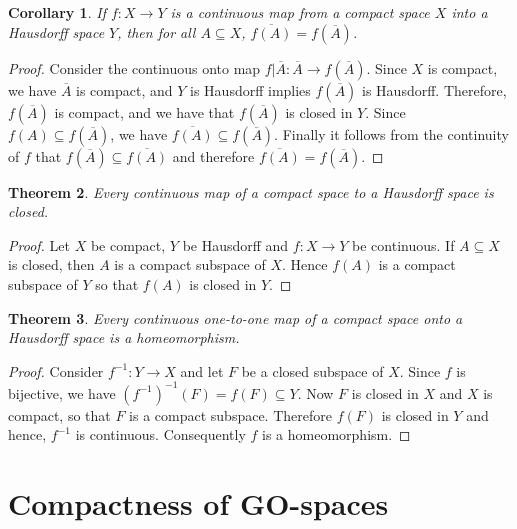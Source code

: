 \documentclass[12pt,oneside,english]{amsbook}
\numberwithin{equation}{section} %
\numberwithin{figure}{section} %
\theoremstyle{plain}
\numberwithin{section}{chapter}
\newtheorem{thm}{Theorem}[section]
\theoremstyle{plain}
\newtheorem{corollary}[thm]{Corollary}
\begin{document}
\begin{corollary}
  If $f: X \to Y$ is a continuous map from a compact space $X$ into a Hausdorff space $Y$, then for all $ A  \subseteq  X$, $\overline{f(A)}  =  f(\overline{A})$.
\end{corollary}
\begin{proof}
  Consider the continuous onto map $f|\overline{A}:\overline{A}  \to f(\overline{A})$. Since $X$ is compact, we have $\overline{A}$ is compact, and $Y$ is Hausdorff implies $f(\overline{A})$ is Hausdorff.  Therefore, $f(\overline{A})$ is compact, and we have that $f(\overline{A})$ is closed in $Y$. Since $f(A)  \subseteq  f(\overline{A})$, we have $\overline{f(A)}  \subseteq  f(\overline{A})$. Finally it follows from the continuity of $f$ that $f(\overline{A})  \subseteq  \overline{f(A)}$ and therefore $\overline{f(A)}  =  f(\overline{A})$.
\end{proof}

\begin{thm}
  Every continuous map of a compact space to a Hausdorff space is closed.
\end{thm}
\begin{proof}
  Let $X$ be compact, $Y$ be Hausdorff and $f: X \to Y$ be continuous. If $A \subseteq X$ is closed, then $A$ is a compact subspace of $X$. Hence $f(A)$ is a compact subspace of $Y$ so that $f(A)$ is closed in $Y$.
\end{proof}

\begin{thm}
  Every continuous one-to-one map of a compact space onto a Hausdorff space is a homeomorphism.
\end{thm}
\begin{proof}
  Consider $f^{-1}: Y \to X$ and let $F$ be a closed subspace of $X$. Since $f$ is bijective, we have $(f^{-1})^{-1}(F)  =  f(F)  \subseteq  Y$. Now $F$ is closed in $X$ and $X$ is compact, so that $F$ is a compact subspace. Therefore $f(F)$ is closed in $Y$ and hence, $f^{-1}$ is continuous. Consequently $f$ is a  homeomorphism. 
\end{proof}

\section{Compactness of GO-spaces}
\end{document}
